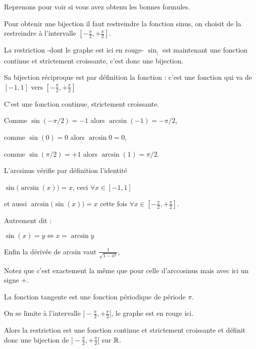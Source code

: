 Reprenons pour voir si vous avez obtenu les bonnes formules.

Pour obtenir une bijection il faut restreindre la fonction sinus,
on choisit de la restreindre à l'intervalle $[-\frac\pi2,+\frac\pi2]$.

La restriction -dont le graphe est ici en rouge- 
$\sin_|$
est maintenant une fonction continue et strictement croissante,
c'est donc une bijection.

\change



Sa bijection réciproque est par définition la fonction  :
c'est une fonction qui va de $[-1,1]$ vers $[-\frac\pi2,+\frac\pi2]$

C'est une fonction continue, strictement croissante.

Comme $\sin(-\pi/2)=-1$ alors $\arcsin(-1) = -\pi/2$,

comme $\sin(0)=0$ alors $\arcsin 0 = 0$,

comme $\sin(\pi/2)=+1$ alors $\arcsin (1) = \pi/2$.


\diapo


L'arcsinus vérifie par définition l'identité

$\sin\big(\arcsin(x)\big) = x$, ceci $\forall x \in [-1,1]$

\change

et aussi $\arcsin\big(\sin(x)\big) = x$ cette fois $\forall x \in [-\frac\pi2,+\frac\pi2]$.

\change

\change

Autrement dit :


$\sin(x)=y \iff x = \arcsin y$


\change

Enfin la dérivée de arcsin vaut
$\frac{1}{\sqrt{1-x^2}}$,

Notez que c'est exactement la même que pour celle d'arccosinus mais avec ici un signe $+$.



\diapo

La fonction tangente est une fonction périodique de période $\pi$.

On se limite à l'intervalle $]-\frac\pi2,+\frac\pi2[$, le graphe est en rouge ici.

Alors la restriction est une fonction continue et 
strictement croissante et définit donc une bijection de $]-\frac\pi2,+\frac\pi2[$ sur $\mathbb{R}$.


